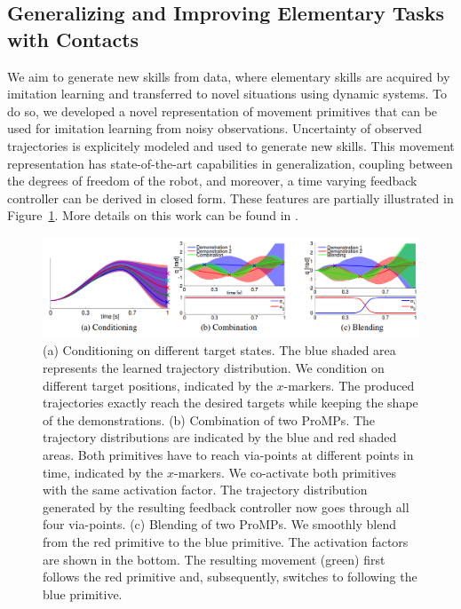 \documentclass[final,5p,twocolumn]{elsarticle}
\begin{document}
\subsection{Generalizing and Improving Elementary Tasks with Contacts}

We aim to generate new skills from data, where elementary skills 
are acquired by imitation learning and transferred to novel situations using 
dynamic systems. To do so, we developed a novel representation of 
movement primitives that can be used for imitation learning from noisy observations.
Uncertainty of observed trajectories is explicitely modeled and used to generate new skills.
This movement representation has state-of-the-art capabilities in generalization, 
coupling between the degrees of freedom of the robot, and moreover, 
a time varying feedback controller can be derived in closed form. 
These features are partially illustrated in Figure~\ref{fig:promps}.
More details on this work can be found in \cite{Paraschos_NIPS_2013}.

\begin{figure}[!ht]
\centering
\includegraphics[width=\linewidth]{./images/ProMPs.png}
 \caption{(a)
Conditioning on different target states. The blue shaded area represents the learned
trajectory distribution. We condition on different target positions, indicated by the $x$-markers. The
produced trajectories exactly reach the desired targets while keeping the shape of the demonstrations.
(b)
Combination of two ProMPs. The trajectory distributions are indicated by the blue and red
shaded areas. Both primitives have to reach via-points at different points in time, indicated by
the $x$-markers. We co-activate both primitives with the same activation factor. The trajectory
distribution generated by the resulting feedback controller now goes through all four via-points.
(c)
Blending of two ProMPs. We smoothly blend from the red primitive to the blue primitive. The
activation factors are shown in the bottom. The resulting movement (green) first follows the red
primitive and, subsequently, switches to following the blue primitive.
}
\label{fig:promps}
\end{figure}
\end{document}
